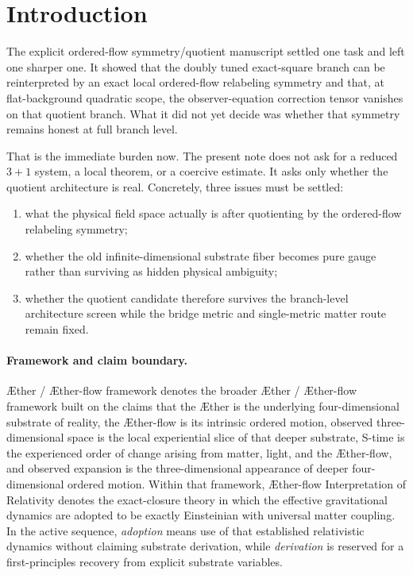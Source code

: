 \documentclass[11pt]{article}
\newcommand{\Aether}{\AE{}ther}
\newcommand{\Aflow}{\AE{}ther-flow}
\newcommand{\TheoryName}{\Aflow{} Interpretation of Relativity}
\newcommand{\TheoryProgram}{\Aether{} / \Aflow{} framework}
\begin{document}
\begin{abstract}
The architecture verdict is therefore positive at current disciplined scope. The ordered-flow relabeling is an honest physical redundancy of the branch, not merely a flat-background coefficient trick, and no revived fiber ambiguity survives after quotienting. This note still stops before any reduced-system, local-coercive, or theorem reopening. It records only that such a reopening is no longer blocked by the old branch-level underdetermination.
\end{abstract}

\section{Introduction}

The explicit ordered-flow symmetry/quotient manuscript settled one task and left one sharper one. It showed that the doubly tuned exact-square branch can be reinterpreted by an exact local ordered-flow relabeling symmetry and that, at flat-background quadratic scope, the observer-equation correction tensor vanishes on that quotient branch. What it did not yet decide was whether that symmetry remains honest at full branch level.

That is the immediate burden now. The present note does not ask for a reduced \(3+1\) system, a local theorem, or a coercive estimate. It asks only whether the quotient architecture is real. Concretely, three issues must be settled:
\begin{enumerate}
    \item what the physical field space actually is after quotienting by the ordered-flow relabeling symmetry;
    \item whether the old infinite-dimensional substrate fiber becomes pure gauge rather than surviving as hidden physical ambiguity;
    \item whether the quotient candidate therefore survives the branch-level architecture screen while the bridge metric and single-metric matter route remain fixed.
\end{enumerate}

\paragraph{Framework and claim boundary.}
\TheoryProgram{} denotes the broader \Aether{} / \Aflow{} framework built on the claims that the \Aether{} is the underlying four-dimensional substrate of reality, the \Aflow{} is its intrinsic ordered motion, observed three-dimensional space is the local experiential slice of that deeper substrate, S-time is the experienced order of change arising from matter, light, and the \Aflow{}, and observed expansion is the three-dimensional appearance of deeper four-dimensional ordered motion. Within that framework, \TheoryName{} denotes the exact-closure theory in which the effective gravitational dynamics are adopted to be exactly Einsteinian with universal matter coupling. In the active sequence, \emph{adoption} means use of that established relativistic dynamics without claiming substrate derivation, while \emph{derivation} is reserved for a first-principles recovery from explicit substrate variables.
\end{document}
